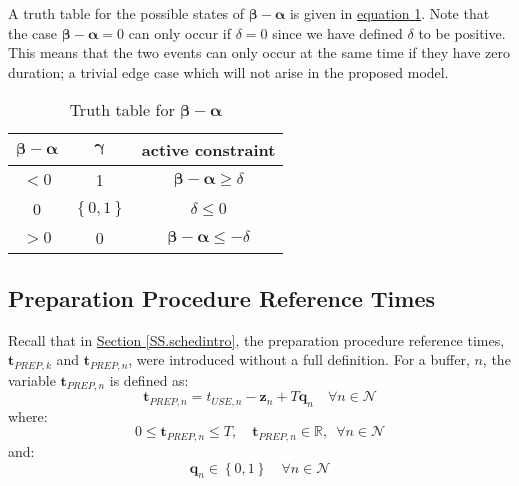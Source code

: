 A truth table for the possible states of 
$\boldsymbol{\beta} - \boldsymbol{\alpha}$ is given in
\hyperref[tbl.truthalphabeta]{equation \ref*{tbl.truthalphabeta}}.
Note that the case $\boldsymbol{\beta} - \boldsymbol{\alpha} = 0$ can only
occur if $\delta = 0$ since we have defined $\delta$ to be positive.
This means that the two events can only occur at the same time if they have
zero duration; a trivial edge case which will not arise in the proposed model.
\begin{table}[h!]
    \centering
    \caption{Truth table for $\boldsymbol{\beta} - \boldsymbol{\alpha}$}
    \label{tbl.truthalphabeta}
    \begin{tabular}{c c | c}
        $\boldsymbol{\beta} - \boldsymbol{\alpha}$ & $\boldsymbol{\gamma}$ &
        active constraint\\ \hline
        $< 0$ & 1 & $\boldsymbol{\beta} - \boldsymbol{\alpha} \ge \delta$\\
        0 & $\left\{ 0,1 \right\}$ & $\delta \le 0$\\
        $> 0$ & 0 & $\boldsymbol{\beta} - \boldsymbol{\alpha} \le -\delta$\\
    \end{tabular}
\end{table}

\subsection{Preparation Procedure Reference Times}\label{SS.prepreftimes}
Recall that in \hyperref[SS.schedintro]{Section \ref*{SS.schedintro}},
the preparation procedure reference times, 
$\boldsymbol{t}_{\mathit{PREP},k}$ and $\boldsymbol{t}_{\mathit{PREP},n}$, were
introduced without a full definition.
For a buffer, $n$, the variable $\boldsymbol{t}_{\mathit{PREP},n}$ is defined
as:
\begin{equation}
    \boldsymbol{t}_{\mathit{PREP},n} = t_{\mathit{USE},n} - \boldsymbol{z}_{n}
    + T \boldsymbol{q}_{n} \quad \forall n \in \mathcal{N}
    \label{eq.tprep}
\end{equation}
where:
\begin{equation}
    0 \le \boldsymbol{t}_{\mathit{PREP},n} \le T, \quad 
    \boldsymbol{t}_{\mathit{PREP},n} \in \mathbb{R}, \enspace \forall n \in 
    \mathcal{N}
    \label{eq.tprep1}
\end{equation}
and:
\begin{equation}
    \boldsymbol{q}_{n} \in \left\{0, 1\right\} \quad \forall n \in \mathcal{N}
    \label{eq.q}
\end{equation}

